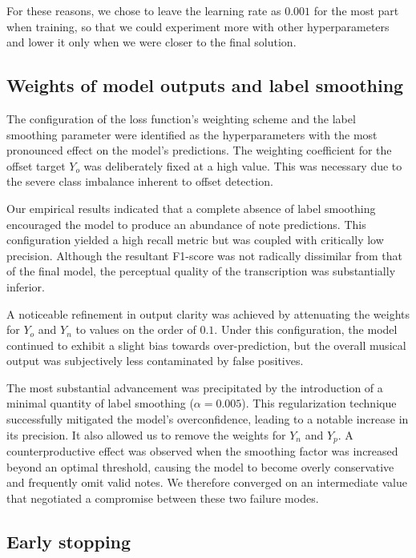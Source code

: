 \documentclass[10pt,twocolumn,letterpaper]{article}
\begin{document}
For these reasons, we chose to leave the learning rate as $\num{0.001}$ for the most part when training, so that we could experiment more with other hyperparameters and lower it only when we were closer to the final solution.

\subsection{Weights of model outputs and label smoothing}

The configuration of the loss function's weighting scheme and the label smoothing parameter were identified as the hyperparameters with the most pronounced effect on the model's predictions. The weighting coefficient for the offset target $Y_o$ was deliberately fixed at a high value. This was necessary due to the severe class imbalance inherent to offset detection.

Our empirical results indicated that a complete absence of label smoothing encouraged the model to produce an abundance of note predictions. This configuration yielded a high recall metric but was coupled with critically low precision. Although the resultant F1-score was not radically dissimilar from that of the final model, the perceptual quality of the transcription was substantially inferior.

A noticeable refinement in output clarity was achieved by attenuating the weights for $Y_o$ and $Y_n$ to values on the order of $\num{0.1}$. Under this configuration, the model continued to exhibit a slight bias towards over-prediction, but the overall musical output was subjectively less contaminated by false positives.

The most substantial advancement was precipitated by the introduction of a minimal quantity of label smoothing ($\alpha = \num{0.005}$). This regularization technique successfully mitigated the model's overconfidence, leading to a notable increase in its precision. It also allowed us to remove the weights for $Y_n$ and $Y_p$. A counterproductive effect was observed when the smoothing factor was increased beyond an optimal threshold, causing the model to become overly conservative and frequently omit valid notes. We therefore converged on an intermediate value that negotiated a compromise between these two failure modes.

\subsection{Early stopping}
\end{document}
